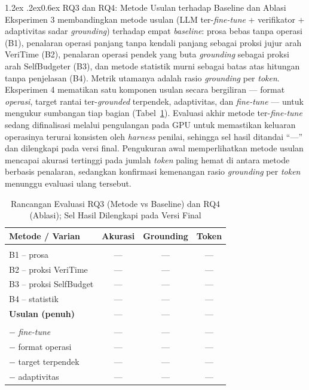 \documentclass[10pt,a4paper,twocolumn]{article}
\makeatletter
\renewcommand\subsection{\@startsection{subsection}{2}{\z@}%
  {1.2ex \@plus .2ex}{0.6ex}%
  {\normalfont\small\bfseries\itshape}}
\makeatother
\begin{document}
\subsection{RQ3 dan RQ4: Metode Usulan terhadap Baseline dan Ablasi}
Eksperimen 3 membandingkan metode usulan (LLM ter-\textit{fine-tune} +
verifikator + adaptivitas sadar \textit{grounding}) terhadap empat
\textit{baseline}: prosa bebas tanpa operasi (B1), penalaran operasi panjang tanpa
kendali panjang sebagai proksi jujur arah VeriTime (B2), penalaran operasi pendek
yang buta \textit{grounding} sebagai proksi arah SelfBudgeter (B3), dan metode
statistik murni sebagai batas atas hitungan tanpa penjelasan (B4). Metrik utamanya
adalah rasio \textit{grounding} per \textit{token}. Eksperimen 4 mematikan satu
komponen usulan secara bergiliran --- format \textit{operasi}, target rantai
ter-\textit{grounded} terpendek, adaptivitas, dan \textit{fine-tune} --- untuk
mengukur sumbangan tiap bagian (Tabel~\ref{tab:rq34}). Evaluasi akhir metode
ter-\textit{fine-tune} sedang difinalisasi melalui pengulangan pada GPU untuk
memastikan keluaran operasinya terurai konsisten oleh \textit{harness} penilai,
sehingga sel hasil ditandai ``---'' dan dilengkapi pada versi final. Pengukuran
awal memperlihatkan metode usulan mencapai akurasi tertinggi pada jumlah
\textit{token} paling hemat di antara metode berbasis penalaran, sedangkan
konfirmasi kemenangan rasio \textit{grounding} per \textit{token} menunggu
evaluasi ulang tersebut.

\begin{table}[t]
\centering
\caption{Rancangan Evaluasi RQ3 (Metode vs Baseline) dan RQ4 (Ablasi);
Sel Hasil Dilengkapi pada Versi Final}
\label{tab:rq34}
\footnotesize
\begin{tabular}{@{}>{\RaggedRight\arraybackslash}p{2.5cm}ccc@{}}
\toprule
\textbf{Metode / Varian} & \textbf{Akurasi} & \textbf{Grounding} & \textbf{Token} \\
\midrule
\multicolumn{4}{@{}l}{\textit{RQ3 --- metode vs baseline}}\\
B1 -- prosa & --- & --- & --- \\
B2 -- proksi VeriTime & --- & --- & --- \\
B3 -- proksi SelfBudget & --- & --- & --- \\
B4 -- statistik & --- & --- & --- \\
\textbf{Usulan (penuh)} & --- & --- & --- \\
\midrule
\multicolumn{4}{@{}l}{\textit{RQ4 --- ablasi (dari Usulan)}}\\
$-$ \textit{fine-tune} & --- & --- & --- \\
$-$ format operasi & --- & --- & --- \\
$-$ target terpendek & --- & --- & --- \\
$-$ adaptivitas & --- & --- & --- \\
\bottomrule
\end{tabular}
\end{table}
\end{document}
